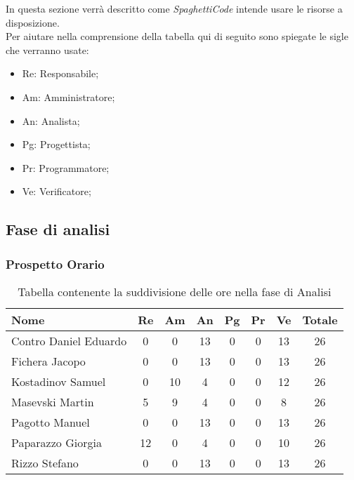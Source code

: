 \documentclass[../piano_di_progetto.tex]{subfiles}
\begin{document}
In questa sezione verrà descritto come \emph{SpaghettiCode} intende usare le risorse a disposizione. \\
Per aiutare nella comprensione della tabella qui di seguito sono spiegate le sigle che verranno usate:
\begin{itemize}
\item Re: Responsabile;
\item Am: Amministratore;
\item An: Analista;
\item Pg: Progettista;
\item Pr: Programmatore;
\item Ve: Verificatore;
\end{itemize}


\subsection{ Fase di analisi}%
\label{sub:fase_analisi}
\subsubsection{Prospetto Orario}


\begin{table}[!ht]

	\centering
	\begin{tabular}{|l|c|c|c|c|c|c|c|}
	\hline
	\rowcolor{lightgray}
	\textbf{Nome} & \textbf{Re} & \textbf{Am} & \textbf{An} & \textbf{Pg}  & \textbf{Pr}   & \textbf{Ve} & \textbf{Totale} \\

	\hline
		Contro Daniel Eduardo & 0 & 0 & 13 & 0 & 0 & 13 & 26 \\
	\hline
		Fichera Jacopo & 0 & 0 & 13 & 0 & 0 & 13 & 26 \\
	\hline
		Kostadinov Samuel & 0 & 10 & 4 & 0 & 0 & 12 & 26 \\			
	\hline
		Masevski Martin & 5 & 9 & 4 & 0 & 0 & 8 & 26 \\
	\hline
		Pagotto Manuel & 0 & 0 & 13 & 0 & 0 & 13 & 26 \\			
	\hline
		Paparazzo Giorgia & 12 & 0 & 4 & 0 & 0 & 10 & 26 \\
	\hline
		Rizzo Stefano & 0 & 0 & 13 & 0 & 0 & 13 & 26 \\
	\hline	
	\end{tabular}
	\caption{Tabella contenente la suddivisione delle ore nella fase di Analisi}
\end{table}
\end{document}
